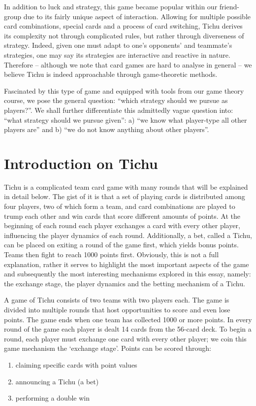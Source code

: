     In addition to luck and strategy, this game became popular within our friend-group due to its fairly unique aspect of interaction. Allowing for multiple possible card combinations, special cards and a process of card switching, Tichu derives its complexity not through complicated rules, but rather through diverseness of strategy. Indeed, given one must adapt to one’s opponents’ and teammate’s strategies, one may say its strategies are interactive and reactive in nature. Therefore – although we note that card games are hard to analyse in general – we believe Tichu is indeed approachable through game-theoretic methods. 

    Fascinated by this type of game and equipped with tools from our game theory course, we pose the general question: “which strategy should we pursue as players?”. We shall further differentiate this admittedly vague question into: “what strategy should we pursue given”: a) “we know what player-type all other players are” and b) “we do not know anything about other players”. 
\section{Introduction on Tichu}

Tichu is a complicated team card game with many rounds that will be explained in detail below. The gist of it is that a set of playing cards is distributed among four players, two of which form a team, and card combinations are played to trump each other and win cards that score different amounts of points. At the beginning of each round each player exchanges a card with every other player, influencing the player dynamics of each round. Additionally, a bet, called a Tichu, can be placed on exiting a round of the game first, which yields bonus points. Teams then fight to reach 1000 points first. Obviously, this is not a full explanation, rather it serves to highlight the most important aspects of the game and subsequently the most interesting mechanisms explored in this essay, namely: the exchange stage, the player dynamics and the betting mechanism of a Tichu. 

A game of Tichu consists of two teams with two players each. The game is divided into multiple rounds that host opportunities to score and even lose points. The game ends when one team has collected 1000 or more points. In every round of the game each player is dealt 14 cards from the 56-card deck. To begin a round, each player must exchange one card with every other player; we coin this game mechanism the ‘exchange stage’. Points can be scored through:\\
\begin{enumerate}
\item claiming specific cards with point values
\item announcing a Tichu (a bet)
\item performing a double win
\end{enumerate}

